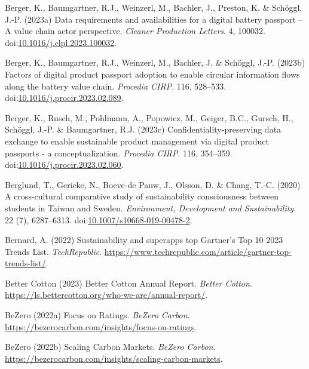 \documentclass[
  letterpaper,
  DIV=11,
  numbers=noendperiod]{scrartcl}
\newlength{\cslhangindent}
\newenvironment{CSLReferences}[2] %
 {\begin{list}{}{%
  \setlength{\itemindent}{0pt}
  \setlength{\leftmargin}{0pt}
  \setlength{\parsep}{0pt}
  \ifodd #1
   \setlength{\leftmargin}{\cslhangindent}
   \setlength{\itemindent}{-1\cslhangindent}
  \fi
  \setlength{\itemsep}{#2\baselineskip}}}
 {\end{list}}
\begin{document}
\begin{CSLReferences}{0}{1}
Berger, K., Baumgartner, R.J., Weinzerl, M., Bachler, J., Preston, K. \&
Schöggl, J.-P. (2023a) Data requirements and availabilities for a
digital battery passport -- {A} value chain actor perspective.
\emph{Cleaner Production Letters}. 4, 100032.
doi:\href{https://doi.org/10.1016/j.clpl.2023.100032}{10.1016/j.clpl.2023.100032}.

Berger, K., Baumgartner, R.J., Weinzerl, M., Bachler, J. \& Schöggl,
J.-P. (2023b) Factors of digital product passport adoption to enable
circular information flows along the battery value chain. \emph{Procedia
CIRP}. 116, 528--533.
doi:\href{https://doi.org/10.1016/j.procir.2023.02.089}{10.1016/j.procir.2023.02.089}.

Berger, K., Rusch, M., Pohlmann, A., Popowicz, M., Geiger, B.C., Gursch,
H., Schöggl, J.-P. \& Baumgartner, R.J. (2023c)
Confidentiality-preserving data exchange to enable sustainable product
management via digital product passports - a conceptualization.
\emph{Procedia CIRP}. 116, 354--359.
doi:\href{https://doi.org/10.1016/j.procir.2023.02.060}{10.1016/j.procir.2023.02.060}.

Berglund, T., Gericke, N., Boeve-de Pauw, J., Olsson, D. \& Chang, T.-C.
(2020) A cross-cultural comparative study of sustainability
consciousness between students in {Taiwan} and {Sweden}.
\emph{Environment, Development and Sustainability}. 22 (7), 6287--6313.
doi:\href{https://doi.org/10.1007/s10668-019-00478-2}{10.1007/s10668-019-00478-2}.

Bernard, A. (2022) Sustainability and superapps top {Gartner}'s {Top} 10
2023 {Trends List}. \emph{TechRepublic}.
\url{https://www.techrepublic.com/article/gartner-top-trends-list/}.

Better Cotton (2023) Better {Cotton Annual Report}. \emph{Better
Cotton}. \url{https://ls.bettercotton.org/who-we-are/annual-report/}.

BeZero (2022a) Focus on {Ratings}. \emph{BeZero Carbon}.
\url{https://bezerocarbon.com/insights/focus-on-ratings}.

BeZero (2022b) Scaling {Carbon Markets}. \emph{BeZero Carbon}.
\url{https://bezerocarbon.com/insights/scaling-carbon-markets}.


\end{CSLReferences}
\end{document}
